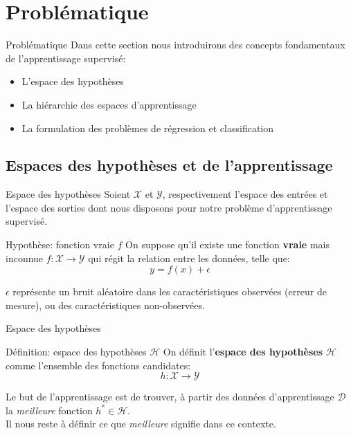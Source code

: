 \documentclass[10pt]{beamer}  %
\begin{document}

\section[Problématique]{Problématique}
\begin{frame}{Problématique}
	Dans cette section nous introduirons des concepts fondamentaux de l'apprentissage supervisé:
	\begin{itemize}
		\item L'espace des hypothèses
		\item La hiérarchie des espaces d'apprentissage
		\item La formulation des problèmes de régression et classification
	\end{itemize}
\end{frame}

\subsection[Espaces]{Espaces des hypothèses et de l'apprentissage}

\begin{frame}{Espace des hypothèses}
	Soient $\mathcal{X}$ et $\mathcal{Y}$, respectivement l'espace des entrées et l'espace des sorties dont nous disposons pour notre problème d'apprentissage supervisé.
	\begin{block}{Hypothèse: fonction vraie $f$}
		On suppose qu'il existe une fonction \textbf{vraie} mais inconnue $f: \mathcal{X} \rightarrow \mathcal{Y}$ qui régit la relation entre les données, telle que:
		\begin{equation}
			y = f(x) + \epsilon
			\nonumber
		\end{equation}
		\hfill
	\end{block}
	$\epsilon$ représente un bruit aléatoire dans les caractéristiques observées (erreur de mesure), ou des caractéristiques non-observées.
\end{frame}

\begin{frame}{Espace des hypothèses}
	\begin{block}{Définition: espace des hypothèses $\mathcal{H}$}
		On définit l'\textbf{espace des hypothèses} $\mathcal{H}$ comme l'ensemble des fonctions candidates:
		\begin{equation}
			h: \mathcal{X} \rightarrow \mathcal{Y}
			\nonumber
		\end{equation}
		\hfill
	\end{block}
	Le but de l'apprentissage est de trouver, à partir des données d'apprentissage $\mathcal{D}$ la \textit{meilleure} fonction $h^* \in \mathcal{H}$. \\
	\vspace{0.5cm}
	Il nous reste à définir ce que \textit{meilleure} signifie dans ce contexte.
\end{frame}
\end{document}
